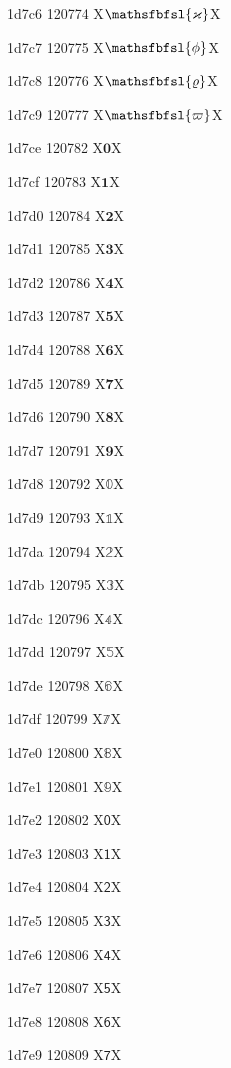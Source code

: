 \documentclass[11pt]{article}
\begin{document}
1d7c6 120774 X{\ensuremath{\mathsfbfsl{\varkappa}}}X

1d7c7 120775 X{\ensuremath{\mathsfbfsl{\phi}}}X

1d7c8 120776 X{\ensuremath{\mathsfbfsl{\varrho}}}X

1d7c9 120777 X{\ensuremath{\mathsfbfsl{\varpi}}}X

1d7ce 120782 X{\ensuremath{\mathbf{0}}}X

1d7cf 120783 X{\ensuremath{\mathbf{1}}}X

1d7d0 120784 X{\ensuremath{\mathbf{2}}}X

1d7d1 120785 X{\ensuremath{\mathbf{3}}}X

1d7d2 120786 X{\ensuremath{\mathbf{4}}}X

1d7d3 120787 X{\ensuremath{\mathbf{5}}}X

1d7d4 120788 X{\ensuremath{\mathbf{6}}}X

1d7d5 120789 X{\ensuremath{\mathbf{7}}}X

1d7d6 120790 X{\ensuremath{\mathbf{8}}}X

1d7d7 120791 X{\ensuremath{\mathbf{9}}}X

1d7d8 120792 X{\ensuremath{\mathbb{0}}}X

1d7d9 120793 X{\ensuremath{\mathbb{1}}}X

1d7da 120794 X{\ensuremath{\mathbb{2}}}X

1d7db 120795 X{\ensuremath{\mathbb{3}}}X

1d7dc 120796 X{\ensuremath{\mathbb{4}}}X

1d7dd 120797 X{\ensuremath{\mathbb{5}}}X

1d7de 120798 X{\ensuremath{\mathbb{6}}}X

1d7df 120799 X{\ensuremath{\mathbb{7}}}X

1d7e0 120800 X{\ensuremath{\mathbb{8}}}X

1d7e1 120801 X{\ensuremath{\mathbb{9}}}X

1d7e2 120802 X{\ensuremath{\mathsf{0}}}X

1d7e3 120803 X{\ensuremath{\mathsf{1}}}X

1d7e4 120804 X{\ensuremath{\mathsf{2}}}X

1d7e5 120805 X{\ensuremath{\mathsf{3}}}X

1d7e6 120806 X{\ensuremath{\mathsf{4}}}X

1d7e7 120807 X{\ensuremath{\mathsf{5}}}X

1d7e8 120808 X{\ensuremath{\mathsf{6}}}X

1d7e9 120809 X{\ensuremath{\mathsf{7}}}X
\end{document}
